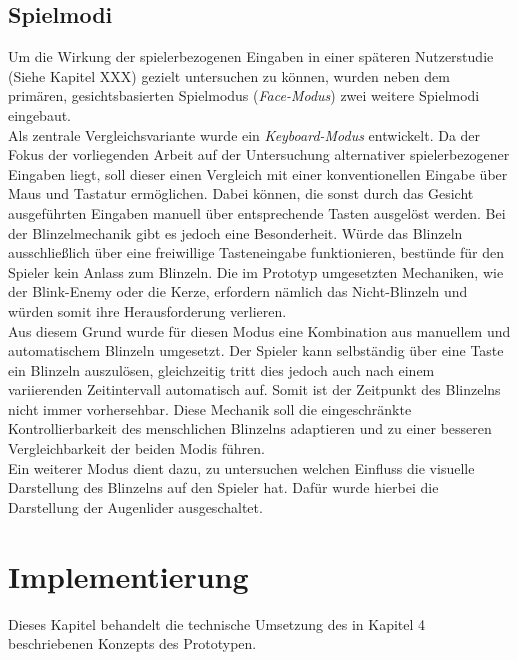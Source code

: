 \documentclass[intern]{cgMA}
\begin{document}
\subsection{Spielmodi}
Um die Wirkung der spielerbezogenen Eingaben in einer späteren Nutzerstudie (Siehe Kapitel XXX) gezielt untersuchen zu können, wurden neben dem primären, gesichtsbasierten Spielmodus (\textit{Face-Modus}) zwei weitere Spielmodi eingebaut.\\
Als zentrale Vergleichsvariante wurde ein \textit{Keyboard-Modus} entwickelt. Da der Fokus der vorliegenden Arbeit auf der Untersuchung alternativer spielerbezogener Eingaben liegt, soll dieser einen Vergleich mit einer konventionellen Eingabe über Maus und Tastatur ermöglichen. Dabei können, die sonst durch das Gesicht ausgeführten Eingaben manuell über entsprechende Tasten ausgelöst werden. Bei der Blinzelmechanik gibt es jedoch eine Besonderheit. Würde das Blinzeln ausschließlich über eine freiwillige Tasteneingabe funktionieren, bestünde für den Spieler kein Anlass zum Blinzeln. Die im Prototyp umgesetzten Mechaniken, wie der Blink-Enemy oder die Kerze, erfordern nämlich das Nicht-Blinzeln und würden somit ihre Herausforderung verlieren.\\
Aus diesem Grund wurde für diesen Modus eine Kombination aus manuellem und automatischem Blinzeln umgesetzt. Der Spieler kann selbständig über eine Taste ein Blinzeln auszulösen, gleichzeitig tritt dies jedoch auch nach einem variierenden Zeitintervall automatisch auf. Somit ist der Zeitpunkt des Blinzelns nicht immer vorhersehbar. Diese Mechanik soll die eingeschränkte Kontrollierbarkeit des menschlichen Blinzelns adaptieren und zu einer besseren Vergleichbarkeit der beiden Modis führen.\\
Ein weiterer Modus dient dazu, zu untersuchen welchen Einfluss die visuelle Darstellung des Blinzelns auf den Spieler hat. Dafür wurde hierbei die Darstellung der Augenlider ausgeschaltet. 
\section{Implementierung}
Dieses Kapitel behandelt die technische Umsetzung des in Kapitel 4 beschriebenen Konzepts des Prototypen. 
\end{document}
